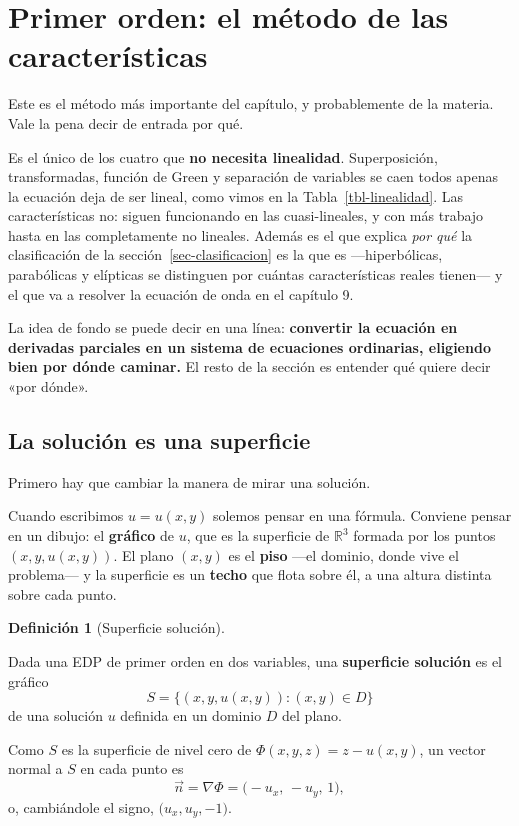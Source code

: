 \documentclass[
  spanish,
  a4paper,
]{scrbook}
\theoremstyle{definition}
\newtheorem{definition}{Definición}[chapter]
\theoremstyle{plain}
\theoremstyle{definition}
\theoremstyle{plain}
\theoremstyle{definition}
\theoremstyle{remark}
\begin{document}
\section{Primer orden: el método de las
características}\label{sec-caracteristicas}

Este es el método más importante del capítulo, y probablemente de la
materia. Vale la pena decir de entrada por qué.

Es el único de los cuatro que \textbf{no necesita linealidad}.
Superposición, transformadas, función de Green y separación de variables
se caen todos apenas la ecuación deja de ser lineal, como vimos en la
Tabla~\ref{tbl-linealidad}. Las características no: siguen funcionando
en las cuasi-lineales, y con más trabajo hasta en las completamente no
lineales. Además es el que explica \emph{por qué} la clasificación de la
sección~\ref{sec-clasificacion} es la que es ---hiperbólicas,
parabólicas y elípticas se distinguen por cuántas características reales
tienen--- y el que va a resolver la ecuación de onda en el capítulo 9.

La idea de fondo se puede decir en una línea: \textbf{convertir la
ecuación en derivadas parciales en un sistema de ecuaciones ordinarias,
eligiendo bien por dónde caminar.} El resto de la sección es entender
qué quiere decir «por dónde».

\subsection{La solución es una superficie}\label{sec-superficie}

Primero hay que cambiar la manera de mirar una solución.

Cuando escribimos \(u = u(x,y)\) solemos pensar en una fórmula. Conviene
pensar en un dibujo: el \textbf{gráfico} de \(u\), que es la superficie
de \(\mathbb{R}^3\) formada por los puntos \((x, y, u(x,y))\). El plano
\((x,y)\) es el \textbf{piso} ---el dominio, donde vive el problema--- y
la superficie es un \textbf{techo} que flota sobre él, a una altura
distinta sobre cada punto.

\begin{definition}[Superficie
solución]\protect\hypertarget{def-superficie-solucion}{}\label{def-superficie-solucion}

Dada una EDP de primer orden en dos variables, una \textbf{superficie
solución} es el gráfico \[
S = \{(x,y,u(x,y)) : (x,y) \in D\}
\] de una solución \(u\) definida en un dominio \(D\) del plano.

Como \(S\) es la superficie de nivel cero de
\(\Phi(x,y,z) = z - u(x,y)\), un vector normal a \(S\) en cada punto es
\[
\vec n = \nabla\Phi = \big(-u_x,\, -u_y,\, 1\big),
\] o, cambiándole el signo, \(\big(u_x, u_y, -1\big)\).

\end{definition}
\end{document}
